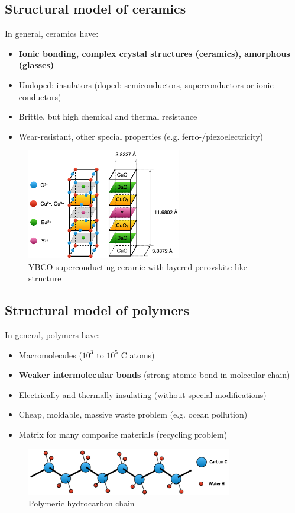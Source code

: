 \documentclass{article}
\begin{document}
\newpage

\subsection{Structural model of ceramics}
In general, ceramics have:
\begin{itemize}
  \item \textbf{Ionic bonding, complex crystal structures (ceramics), amorphous (glasses)}
  \item Undoped: insulators (doped: semiconductors, superconductors or ionic conductors)
  \item Brittle, but high chemical and thermal resistance
  \item Wear-resistant, other special properties (e.g. ferro-/piezoelectricity)
\end{itemize}

\begin{figure}[ht!]
  \centering
  \includegraphics[width=0.6\textwidth]{media/ceramic_structure.png}
  \caption*{YBCO superconducting ceramic with layered perovskite-like structure}
\end{figure}

\subsection{Structural model of polymers}
In general, polymers have:
\begin{itemize}
  \item Macromolecules ($10^3$ to $10^5$ C atoms)
  \item \textbf{Weaker intermolecular bonds} (strong atomic bond in molecular chain)
  \item Electrically and thermally insulating (without special modifications)
  \item Cheap, moldable, massive waste problem (e.g. ocean pollution)
  \item Matrix for many composite materials (recycling problem)
\end{itemize}
\begin{figure}[ht!]
  \centering
  \includegraphics[width=0.8\textwidth]{media/polymer_structure.png}
  \caption*{Polymeric hydrocarbon chain}
\end{figure}
\end{document}
